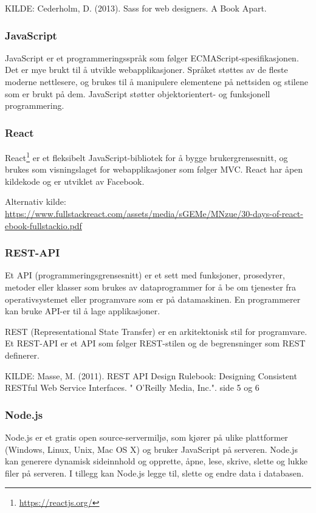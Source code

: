 KILDE: Cederholm, D. (2013). Sass for web designers. A Book Apart.

\subsubsection{JavaScript}
JavaScript \cite{mdn2019jav} er et programmeringsspråk som følger ECMAScript-spesifikasjonen. Det er mye brukt til å utvikle webapplikasjoner. Språket støttes av de fleste moderne nettlesere, og brukes til å manipulere elementene på nettsiden og stilene som er brukt på dem. JavaScript støtter objektorientert- og funksjonell programmering.

\subsubsection{React}
React\footnote{\url{https://reactjs.org/}} er et fleksibelt JavaScript-bibliotek for å bygge brukergrensesnitt, og brukes som visningslaget for webapplikasjoner som følger MVC. React har åpen kildekode og er utviklet av Facebook.

Alternativ kilde: \url{https://www.fullstackreact.com/assets/media/sGEMe/MNzue/30-days-of-react-ebook-fullstackio.pdf}

\subsubsection{REST-API}
Et API (programmeringsgrensesnitt) er et sett med funksjoner, prosedyrer, metoder eller klasser som brukes av dataprogrammer for å be om tjenester fra operativsystemet eller programvare som er på datamaskinen. En programmerer kan bruke API-er til å lage applikasjoner.

REST (Representational State Transfer) er en arkitektonisk stil for programvare. Et REST-API er et API som følger REST-stilen og de begrensninger som REST definerer.

KILDE: Masse, M. (2011). REST API Design Rulebook: Designing Consistent RESTful Web Service Interfaces. " O'Reilly Media, Inc.".
side 5 og 6

\subsubsection{Node.js}
Node.js \cite{w3schools2019win} er et gratis open source-servermiljø, som kjører på ulike plattformer (Windows, Linux, Unix, Mac OS X) og bruker JavaScript på serveren. Node.js kan generere dynamisk sideinnhold og opprette, åpne, lese, skrive, slette og lukke filer på serveren. I tillegg kan Node.js legge til, slette og endre data i databasen.

